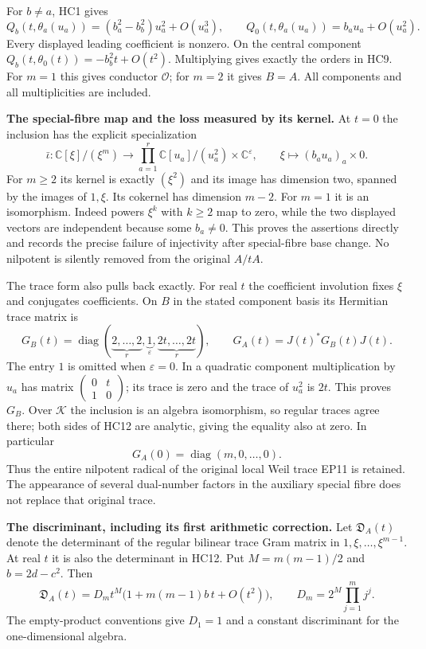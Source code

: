 \documentclass[11pt,a4paper]{article}
\theoremstyle{definition}\newtheorem{definition}[theorem]{Definition}
\begin{document}
For $b\ne a$, HC1 gives
\[
 Q_b(t,\theta_a(u_a))
      =(b_a^2-b_b^2)u_a^2+O(u_a^3),\qquad
 Q_0(t,\theta_a(u_a))=b_a u_a+O(u_a^2).
 \tag{HC10}
\]
Every displayed leading coefficient is nonzero. On the central
component $Q_b(t,\theta_0(t))=-b_b^2t+O(t^2)$. Multiplying gives
exactly the orders in HC9. For $m=1$ this gives conductor $\mathcal O$;
for $m=2$ it gives $B=A$. All components and all multiplicities
are included.

\HC\textbf{The special-fibre map and the loss measured by its kernel.}
At $t=0$ the inclusion has the explicit specialization
\[
 \bar\iota:\mathbb C[\xi]/(\xi^m)
   \longrightarrow
      \prod_{a=1}^r\mathbb C[u_a]/(u_a^2)\times\mathbb C^\varepsilon,
 \qquad \xi\longmapsto(b_au_a)_a\times0.
 \tag{HC11}
\]
For $m\ge2$ its kernel is exactly $(\xi^2)$ and its image has
dimension two, spanned by the images of $1,\xi$. Its cokernel
has dimension $m-2$. For $m=1$ it is an isomorphism.
Indeed powers $\xi^k$ with $k\ge2$ map to zero, while the two
displayed vectors are independent because some $b_a\ne0$.
This proves the assertions directly and records the precise failure
of injectivity after special-fibre base change. No nilpotent is
silently removed from the original $A/tA$.

The trace form also pulls back exactly. For real $t$ the coefficient
involution fixes $\xi$ and conjugates coefficients. On $B$ in the
stated component basis its Hermitian trace matrix is
\[
 G_B(t)=\operatorname{diag}
      (\underbrace{2,\ldots,2}_{r},
        \underbrace{1}_{\varepsilon},
        \underbrace{2t,\ldots,2t}_{r}),
 \qquad G_A(t)=J(t)^*G_B(t)J(t).
 \tag{HC12}
\]
The entry $1$ is omitted when $\varepsilon=0$. In a quadratic
component multiplication by $u_a$ has matrix
$\left(\begin{smallmatrix}0&t\\1&0\end{smallmatrix}\right)$;
its trace is zero and the trace of $u_a^2$ is $2t$. This proves
$G_B$. Over $\mathcal K$ the inclusion is an algebra isomorphism,
so regular traces agree there; both sides of HC12 are analytic,
giving the equality also at zero. In particular
\[
 G_A(0)=\operatorname{diag}(m,0,\ldots,0).
 \tag{HC13}
\]
Thus the entire nilpotent radical of the original local Weil trace
EP11 is retained. The appearance of several dual-number factors
in the auxiliary special fibre does not replace that original trace.

\HC\textbf{The discriminant, including its first arithmetic correction.}
Let $\mathfrak D_A(t)$ denote the determinant of the regular
bilinear trace Gram matrix in $1,\xi,\ldots,\xi^{m-1}$.
At real $t$ it is also the determinant in HC12. Put
$M=m(m-1)/2$ and $b=2d-c^2$. Then
\[
 \boxed{\mathfrak D_A(t)=D_m t^M
      \bigl(1+m(m-1)b\,t+O(t^2)\bigr),\qquad
 D_m=2^M\prod_{j=1}^m j^j.}
 \tag{HC14}
\]
The empty-product conventions give $D_1=1$ and a constant
discriminant for the one-dimensional algebra.
\end{document}
